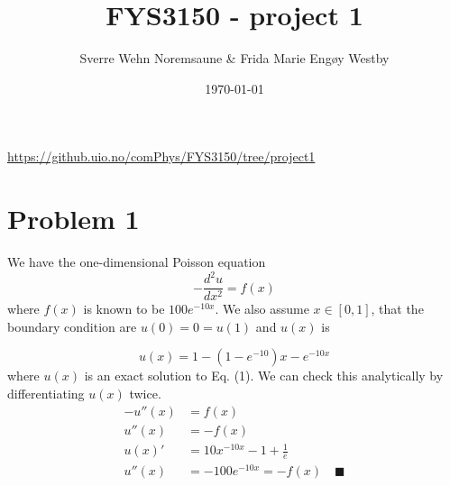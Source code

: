 \documentclass[english,notitlepage]{revtex4-1}  %
\begin{document}
\title{FYS3150 - project 1}      %
\author{Sverre Wehn Noremsaune \& Frida Marie Engøy Westby}          %
\date{\today}                             %
\noaffiliation                            %


\maketitle 

\begin{center}
	\url{https://github.uio.no/comPhys/FYS3150/tree/project1}
\end{center}

    
\section*{Problem 1}

We have the one-dimensional Poisson equation
\begin{equation}\label{eq:one-dimensional Poisson}
    - \frac{d^2u}{dx^2} = f(x)
\end{equation}
where $f(x)$ is known to be $100e^{-10x}$. We also assume $x \in [0,1]$, that the boundary condition are $u(0) = 0 = u(1)$ and $u(x)$ is

\begin{equation}\label{eq:exact solution one-dimensional Poisson}
    u(x) = 1 - (1 - e^{-10})x-e^{-10x}
\end{equation}
where $u(x)$ is an exact solution to Eq. (1). We can check this analytically by differentiating $u(x)$ twice.
\begin{equation*}
    \begin{split}
    	-u''(x) &= f(x) \\
    	u''(x) &= -f(x) \\
        u(x)' &= 10x^{-10x} - 1 + \frac{1}{e} \\
        u''(x) &= -100e^{-10x}= -f(x) \quad \blacksquare
    \end{split}
\end{equation*}


\end{document}
